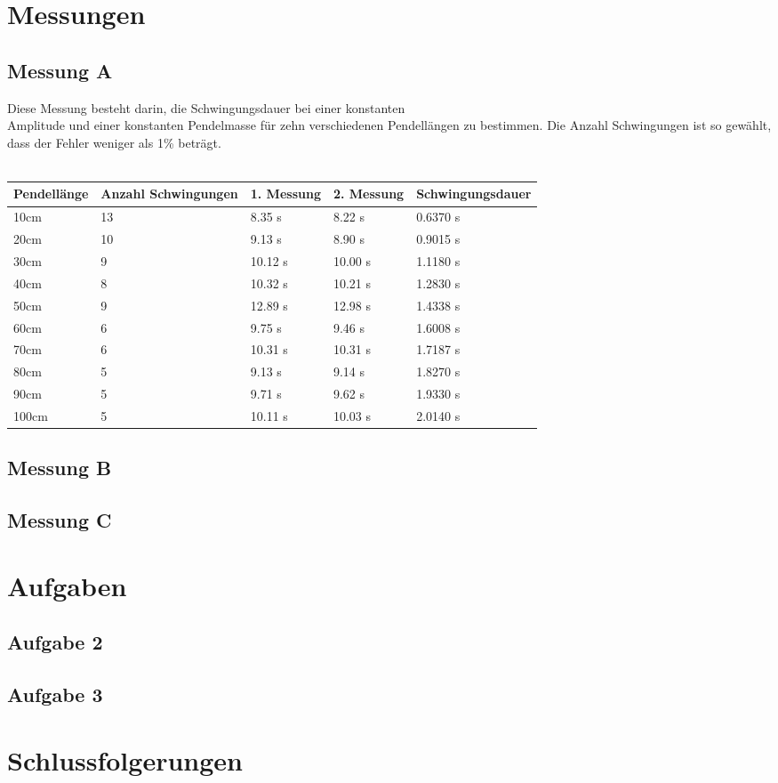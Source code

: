 \documentclass{report}
\begin{document}
    \chapter*{Messungen}
    \section*{Messung A}
    Diese Messung besteht darin, die Schwingungsdauer bei einer konstanten \\ Amplitude und einer konstanten Pendelmasse für zehn verschiedenen Pendellängen zu bestimmen. Die Anzahl Schwingungen ist so gewählt, dass der Fehler weniger als 1\% beträgt. \\
    \\
    \begin{center}
        \begin{tabular}{ | m{5em} | m{4cm}| m{2cm} | m{2cm} | m{3cm} | }
            \hline
            Pendellänge & Anzahl Schwingungen &1. Messung & 2. Messung & Schwingungsdauer\\ 
            \hline
            10cm & 13 & 8.35 s & 8.22 s & 0.6370 s\\ 
            \hline
            20cm & 10 & 9.13 s & 8.90 s & 0.9015 s \\ 
            \hline
            30cm & 9 & 10.12 s & 10.00 s & 1.1180 s \\ 
            \hline
            40cm & 8 & 10.32 s & 10.21 s & 1.2830 s \\ 
            \hline
            50cm & 9 & 12.89 s & 12.98 s & 1.4338 s \\ 
            \hline
            60cm & 6 & 9.75 s & 9.46 s & 1.6008 s \\ 
            \hline
            70cm & 6 & 10.31 s & 10.31 s & 1.7187 s \\ 
            \hline
            80cm & 5 & 9.13 s & 9.14 s & 1.8270 s \\ 
            \hline
            90cm & 5 & 9.71 s & 9.62 s & 1.9330 s \\ 
            \hline
            100cm & 5 & 10.11 s & 10.03 s & 2.0140 s \\ 
            \hline

          \end{tabular}
    \end{center}
    \section*{Messung B}
    \section*{Messung C}
    \chapter*{Aufgaben}
    \section*{Aufgabe 2}
    \section*{Aufgabe 3}
    \chapter*{Schlussfolgerungen}
\end{document}
